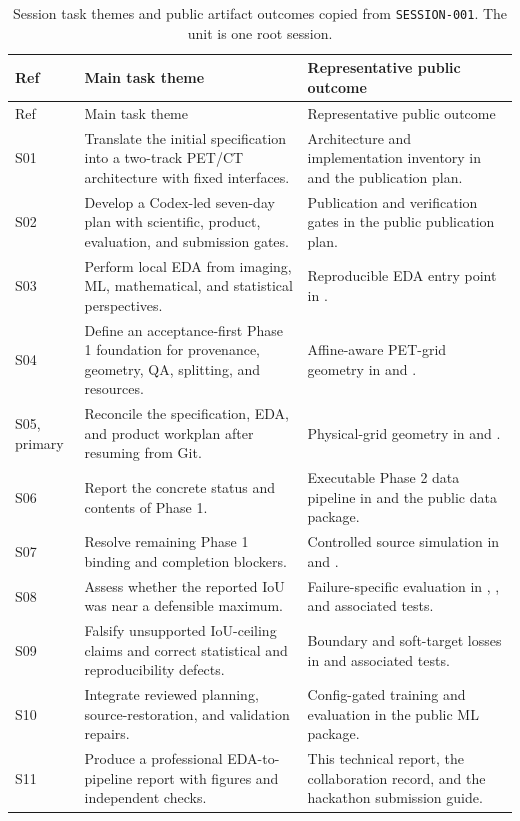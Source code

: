 \documentclass[11pt]{article}
\newcommand{\evidenceid}[1]{\texttt{#1}}
\begin{document}
\begingroup
\footnotesize
\begin{longtable}{B{0.07\textwidth} L{0.40\textwidth} L{0.43\textwidth}}
\caption{Session task themes and public artifact outcomes copied from \evidenceid{SESSION-001}. The unit is one root session.}\label{tab:codex-session-outcomes}\\
\toprule
Ref & Main task theme & Representative public outcome \\
\midrule
\endfirsthead
\toprule
Ref & Main task theme & Representative public outcome \\
\midrule
\endhead
S01 & Translate the initial specification into a two-track PET/CT architecture with fixed interfaces. & Architecture and implementation inventory in  and the publication plan. \\
S02 & Develop a Codex-led seven-day plan with scientific, product, evaluation, and submission gates. & Publication and verification gates in the public publication plan. \\
S03 & Perform local EDA from imaging, ML, mathematical, and statistical perspectives. & Reproducible EDA entry point in . \\
S04 & Define an acceptance-first Phase 1 foundation for provenance, geometry, QA, splitting, and resources. & Affine-aware PET-grid geometry in  and . \\
S05, primary & Reconcile the specification, EDA, and product workplan after resuming from Git. & Physical-grid geometry in  and . \\
S06 & Report the concrete status and contents of Phase 1. & Executable Phase 2 data pipeline in  and the public data package. \\
S07 & Resolve remaining Phase 1 binding and completion blockers. & Controlled source simulation in  and . \\
S08 & Assess whether the reported IoU was near a defensible maximum. & Failure-specific evaluation in , , and associated tests. \\
S09 & Falsify unsupported IoU-ceiling claims and correct statistical and reproducibility defects. & Boundary and soft-target losses in  and associated tests. \\
S10 & Integrate reviewed planning, source-restoration, and validation repairs. & Config-gated training and evaluation in the public ML package. \\
S11 & Produce a professional EDA-to-pipeline report with figures and independent checks. & This technical report, the collaboration record, and the hackathon submission guide. \\
\bottomrule
\end{longtable}
\endgroup
\end{document}
